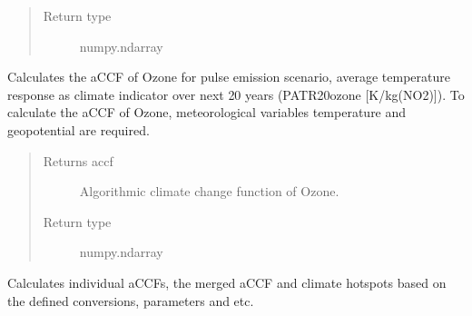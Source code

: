 \documentclass[a4paper,11pt,english]{sphinxmanual}
\begin{document}
\begin{fulllineitems}
\begin{fulllineitems}
\begin{quote}
\begin{description}
\item[{Return type}] \leavevmode
numpy.ndarray

\end{description}\end{quote}

\end{fulllineitems}


\begin{fulllineitems}
\label{\detokenize{modules:envlib.accf.GeTaCCFs.accf_o3}}
Calculates the aCCF of Ozone for pulse emission scenario, average temperature response as climate
indicator over next 20 years (P\sphinxhyphen{}ATR20\sphinxhyphen{}ozone {[}K/kg(NO2){]}). To calculate the aCCF of Ozone, meteorological variables
temperature and geopotential are required.
\begin{quote}\begin{description}
\item[{Returns accf}] \leavevmode
Algorithmic climate change function of Ozone.

\item[{Return type}] \leavevmode
numpy.ndarray

\end{description}\end{quote}

\end{fulllineitems}


\begin{fulllineitems}
\label{\detokenize{modules:envlib.accf.GeTaCCFs.get_accfs}}
Calculates individual aCCFs, the merged aCCF and climate hotspots based on the defined conversions, parameters and etc.

\end{fulllineitems}



\end{fulllineitems}
\end{document}
